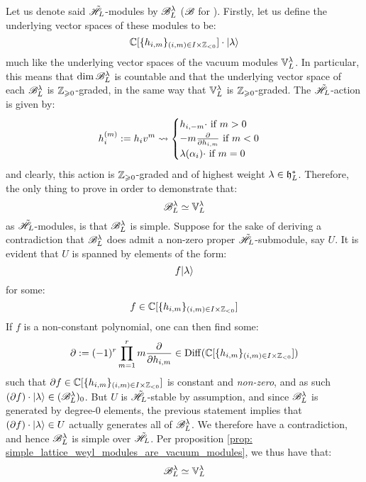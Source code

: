\begin{example}
                Let us denote said $\tilde{\mathscr{H}}_L$-modules by $\mathscr{B}_L^{\lambda}$ ($\mathscr{B}$ for ). Firstly, let us define the underlying vector spaces of these modules to be:
                    $$\bbC[ \{h_{i, m}\}_{(i, m) \in I \x \Z_{< 0}} ] \cdot \ket{\lambda}$$
                much like the underlying vector spaces of the vacuum modules $\mathbb{V}_L^{\lambda}$. In particular, this means that $\dim \mathscr{B}_L^{\lambda}$ is countable and that the underlying vector space of each $\mathscr{B}_L^{\lambda}$ is $\mathbb{Z}_{\geqslant 0}$-graded, in the same way that $\mathbb{V}_L^{\lambda}$ is $\mathbb{Z}_{\geqslant 0}$-graded. The $\tilde{\mathscr{H}}_L$-action is given by:
                    $$
                        h_i^{(m)} := h_i v^m \leadsto
                        \begin{cases}
                            \text{$h_{i, -m} \cdot$ if $m > 0$}
                            \\
                            \text{$-m \frac{\partial}{\partial h_{i, m}}$ if $m < 0$}
                            \\
                            \text{$\lambda(\alpha_i) \cdot$ if $m = 0$}
                        \end{cases}
                    $$
                and clearly, this action is $\mathbb{Z}_{\geqslant 0}$-graded and of highest weight $\lambda \in \mathfrak{h}_L^*$. Therefore, the only thing to prove in order to demonstrate that:
                    $$\mathscr{B}_L^{\lambda} \simeq \mathbb{V}_L^{\lambda}$$
                as $\tilde{\mathscr{H}}_L$-modules, is that $\mathscr{B}_L^{\lambda}$ is simple. Suppose for the sake of deriving a contradiction that $\mathscr{B}_L^{\lambda}$ does admit a non-zero proper $\tilde{\mathscr{H}}_L$-submodule, say $U$. It is evident that $U$ is spanned by elements of the form:
                    $$f \lvert {\lambda} \rangle$$
                for some:
                    $$f \in \bbC[ \{h_{i, m}\}_{(i, m) \in I \x \Z_{< 0}} ]$$
                If $f$ is a non-constant polynomial, one can then find some:
                    $$\del := (-1)^r \prod_{m = 1}^r m \frac{\del}{\del h_{i, m}} \in \Diff(\bbC[ \{h_{i, m}\}_{(i, m) \in I \x \Z_{< 0}} ])$$
                such that $\del f \in \bbC[ \{h_{i, m}\}_{(i, m) \in I \x \Z_{< 0}} ]$ is constant and \textit{non-zero}, and as such $(\partial f) \cdot \lvert {\lambda} \rangle \in (\mathscr{B}_L^{\lambda})_0$. But $U$ is $\tilde{\mathscr{H}}_L$-stable by assumption, and since $\mathscr{B}_L^{\lambda}$ is generated by degree-$0$ elements, the previous statement implies that $(\partial f) \cdot \lvert {\lambda} \rangle \in U$ actually generates all of $\mathscr{B}_L^{\lambda}$. We therefore have a contradiction, and hence $\mathscr{B}_L^{\lambda}$ is simple over $\tilde{\mathscr{H}}_L$. Per proposition \ref{prop: simple_lattice_weyl_modules_are_vacuum_modules}, we thus have that:
                    $$\mathscr{B}_L^{\lambda} \simeq \mathbb{V}_L^{\lambda}$$
            \end{example}

